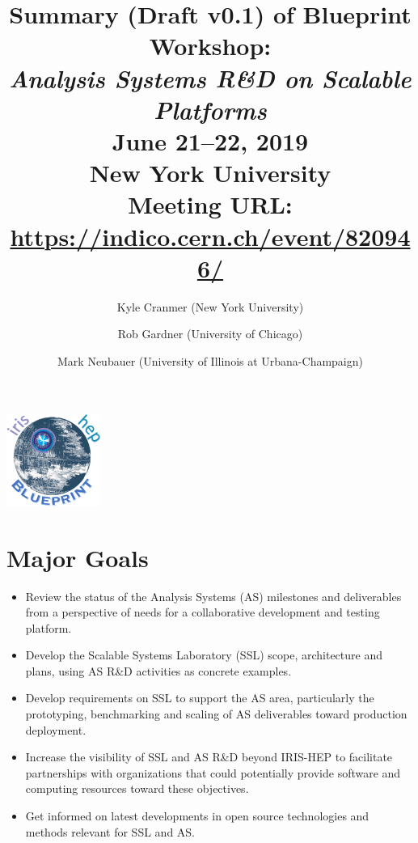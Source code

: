 \documentclass[11pt,letterpaper,fleqn]{article}
\date{} %
\title{\large Summary (Draft v0.1) of Blueprint Workshop: \\
\vspace{1pt}
\LARGE \textit{Analysis Systems R\&D on Scalable Platforms} \\
\color{black} \normalsize
\vspace{10pt}
June 21--22, 2019 \\
New York University \\
Meeting URL: \href{https://indico.cern.ch/event/820946/}{https://indico.cern.ch/event/820946/}
} %
\author{Kyle Cranmer {\normalfont(New York University)}
      \and  Rob Gardner {\normalfont(University of Chicago)}
      \and  Mark Neubauer {\normalfont(University of Illinois at Urbana-Champaign)}
      }
\begin{document}
\maketitle %
\normalfont

\thispagestyle{firststyle}

\vspace{-250pt}
\hspace{360pt}
\includegraphics[height=30mm]{../../../figures/iris-hep-bluprint-logo.png}

\vspace{120pt}
\section*{Major Goals}
\vspace{3pt}
\begin{itemize}
  \item Review the status of the Analysis Systems (AS) milestones and deliverables from a perspective of needs for a collaborative development and testing platform.
  \item Develop the Scalable Systems Laboratory (SSL) scope, architecture and plans, using AS R\&D activities as concrete examples.
  \item Develop requirements on SSL to support the AS area, particularly the prototyping, benchmarking and scaling of AS deliverables toward production deployment.
  \item Increase the visibility of SSL and AS R\&D beyond IRIS-HEP to facilitate partnerships with organizations that could potentially provide software and computing resources toward these objectives.
  \item Get informed on latest developments in open source technologies and methods relevant for SSL and AS.
\end{itemize}
\end{document}
